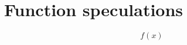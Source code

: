 \documentclass{article}
\begin{document}
\section{Function speculations}

\[ f (x) \]
\end{document}
